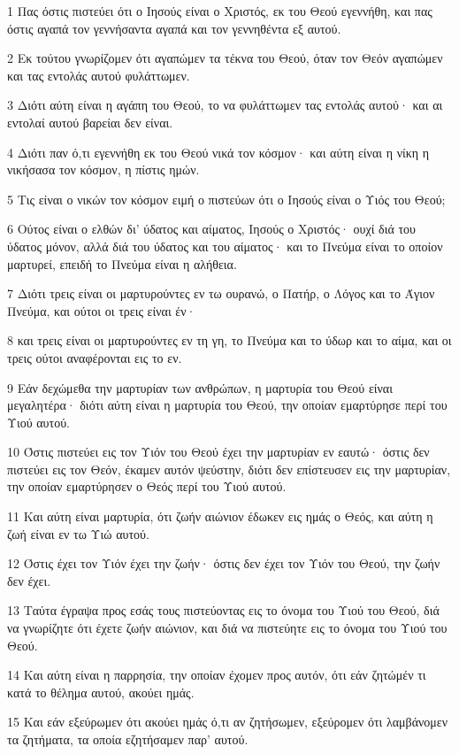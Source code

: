 \par 1 Πας όστις πιστεύει ότι ο Ιησούς είναι ο Χριστός, εκ του Θεού εγεννήθη, και πας όστις αγαπά τον γεννήσαντα αγαπά και τον γεννηθέντα εξ αυτού.
\par 2 Εκ τούτου γνωρίζομεν ότι αγαπώμεν τα τέκνα του Θεού, όταν τον Θεόν αγαπώμεν και τας εντολάς αυτού φυλάττωμεν.
\par 3 Διότι αύτη είναι η αγάπη του Θεού, το να φυλάττωμεν τας εντολάς αυτού· και αι εντολαί αυτού βαρείαι δεν είναι.
\par 4 Διότι παν ό,τι εγεννήθη εκ του Θεού νικά τον κόσμον· και αύτη είναι η νίκη η νικήσασα τον κόσμον, η πίστις ημών.
\par 5 Τις είναι ο νικών τον κόσμον ειμή ο πιστεύων ότι ο Ιησούς είναι ο Υιός του Θεού;
\par 6 Ούτος είναι ο ελθών δι' ύδατος και αίματος, Ιησούς ο Χριστός· ουχί διά του ύδατος μόνον, αλλά διά του ύδατος και του αίματος· και το Πνεύμα είναι το οποίον μαρτυρεί, επειδή το Πνεύμα είναι η αλήθεια.
\par 7 Διότι τρεις είναι οι μαρτυρούντες εν τω ουρανώ, ο Πατήρ, ο Λόγος και το Άγιον Πνεύμα, και ούτοι οι τρεις είναι έν·
\par 8 και τρεις είναι οι μαρτυρούντες εν τη γη, το Πνεύμα και το ύδωρ και το αίμα, και οι τρεις ούτοι αναφέρονται εις το εν.
\par 9 Εάν δεχώμεθα την μαρτυρίαν των ανθρώπων, η μαρτυρία του Θεού είναι μεγαλητέρα· διότι αύτη είναι η μαρτυρία του Θεού, την οποίαν εμαρτύρησε περί του Υιού αυτού.
\par 10 Όστις πιστεύει εις τον Υιόν του Θεού έχει την μαρτυρίαν εν εαυτώ· όστις δεν πιστεύει εις τον Θεόν, έκαμεν αυτόν ψεύστην, διότι δεν επίστευσεν εις την μαρτυρίαν, την οποίαν εμαρτύρησεν ο Θεός περί του Υιού αυτού.
\par 11 Και αύτη είναι μαρτυρία, ότι ζωήν αιώνιον έδωκεν εις ημάς ο Θεός, και αύτη η ζωή είναι εν τω Υιώ αυτού.
\par 12 Όστις έχει τον Υιόν έχει την ζωήν· όστις δεν έχει τον Υιόν του Θεού, την ζωήν δεν έχει.
\par 13 Ταύτα έγραψα προς εσάς τους πιστεύοντας εις το όνομα του Υιού του Θεού, διά να γνωρίζητε ότι έχετε ζωήν αιώνιον, και διά να πιστεύητε εις το όνομα του Υιού του Θεού.
\par 14 Και αύτη είναι η παρρησία, την οποίαν έχομεν προς αυτόν, ότι εάν ζητώμέν τι κατά το θέλημα αυτού, ακούει ημάς.
\par 15 Και εάν εξεύρωμεν ότι ακούει ημάς ό,τι αν ζητήσωμεν, εξεύρομεν ότι λαμβάνομεν τα ζητήματα, τα οποία εζητήσαμεν παρ' αυτού.
